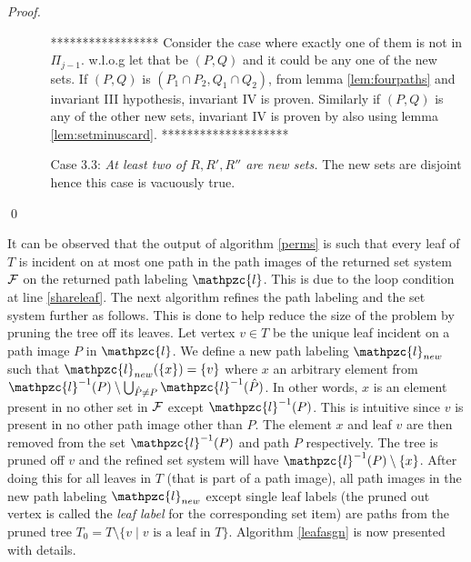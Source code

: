 \documentclass{llncs}
\def\cF{{\cal F}}
\def\hP{{\hat P}}
\def\cl{\mathpzc{l}}
\begin{document}
\begin{proof}
\begin{enumerate}
\begin{enumerate}
      ***************** 
      Consider the case where exactly one of them is
      not in $\Pi_{j-1}$. w.l.o.g let that be $(P,Q)$ and it could be any
  one of the new sets. If $(P,Q)$ is $(P_1 \cap P_2, Q_1 \cap Q_2)$,
  from lemma \ref{lem:fourpaths} and invariant III hypothesis,
  invariant IV is proven. Similarly if $(P,Q)$ is any of the other new
  sets, invariant IV is proven by also using lemma
  \ref{lem:setminuscard}.
  ******************** 

    \item [Case 3.3:] {\em At least two of $R, R', R''$ are new sets.}
      The new sets are disjoint hence this case is vacuously true.
    \end{enumerate}
  \end{enumerate} \qed

\end{proof}



\noindent

\noindent
It can be observed that the output of algorithm \ref{perms} is such
that every leaf of $T$ is incident on at most one path in the path
images of the returned set system $\cF$ on the returned path labeling
$\cl$. This is due to the loop condition at line \ref{shareleaf}. The
next algorithm refines the path labeling and the set system further as
follows. This is done to help reduce the size of the problem by
pruning the tree off its leaves.  Let vertex $v \in T$ be the unique
leaf incident on a path image $P$ in $\cl$.  We define a new path
labeling $\cl_{new}$ such that $\cl_{new}(\{x\}) = \{v\}$ where $x$ an
arbitrary element from $\cl^{-1}(P) \setminus \bigcup_{\hP \ne P}
\cl^{-1}(\hP)$. In other words, $x$ is an element present in no other
set in $\cF$ except $\cl^{-1}(P)$. This is intuitive since $v$ is
present in no other path image other than $P$.  The element $x$ and
leaf $v$ are then removed from the set $\cl^{-1}(P)$ and path $P$
respectively. The tree is pruned off $v$ and the refined set system
will have $\cl^{-1}(P) \setminus \{x\}$. After doing this for all
leaves in $T$ (that is part of a path image), all path images in the
new path labeling $\cl_{new}$ except single leaf labels (the pruned
out vertex is called the {\em leaf label} for the corresponding set
item) 
are paths from the pruned
tree $T_0 = T \setminus \{v \mid v \text{ is a leaf in }
T\}$. Algorithm \ref{leafasgn} is now presented with details.
\end{document}
